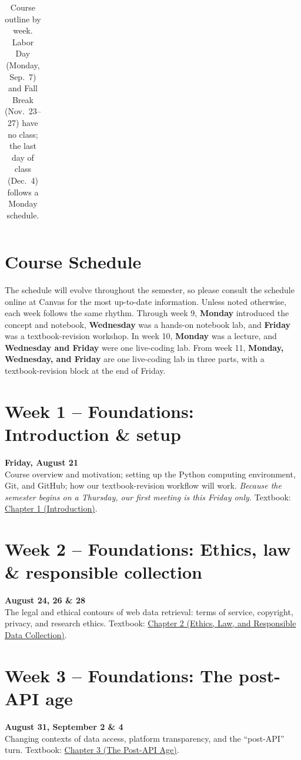 \documentclass[11pt]{memoir}
\def\bookurl{https://cuinfoscience.github.io/Web-Data-Science-Book/}
\newcommand{\bookch}[2]{\href{\bookurl#1.html}{#2}}
\begin{document}
\begin{table}[ht]
\begin{tabular}{cccc}
        \bottomrule[.15em]
    \end{tabular}
    \caption{Course outline by week. Labor Day (Monday, Sep.~7) and Fall Break (Nov.~23--27) have no class; the last day of class (Dec.~4) follows a Monday schedule.}
    \label{tab:course_outline}
\end{table}

\clearpage

\section{\textbf{Course Schedule}}

The schedule will evolve throughout the semester, so please consult the schedule online at Canvas for the most up-to-date information. Unless noted otherwise, each week follows the same rhythm. Through week 9, \textbf{Monday} introduced the concept and notebook, \textbf{Wednesday} was a hands-on notebook lab, and \textbf{Friday} was a textbook-revision workshop. In week 10, \textbf{Monday} was a lecture, and \textbf{Wednesday and Friday} were one live-coding lab. From week 11, \textbf{Monday, Wednesday, and Friday} are one live-coding lab in three parts, with a textbook-revision block at the end of Friday.

\section{Week 1 -- Foundations: Introduction \& setup}
\textcolor{CUGold}{\textbf{Friday, August 21}}\\
Course overview and motivation; setting up the Python computing environment, Git, and GitHub; how our textbook-revision workflow will work. \textit{Because the semester begins on a Thursday, our first meeting is this Friday only.} Textbook: \bookch{ch-01-introduction}{Chapter 1 (Introduction)}.

\section{Week 2 -- Foundations: Ethics, law \& responsible collection}
\textcolor{CUGold}{\textbf{August 24, 26 \& 28}}\\
The legal and ethical contours of web data retrieval: terms of service, copyright, privacy, and research ethics. Textbook: \bookch{ch-02-ethics}{Chapter 2 (Ethics, Law, and Responsible Data Collection)}.

\section{Week 3 -- Foundations: The post-API age}
\textcolor{CUGold}{\textbf{August 31, September 2 \& 4}}\\
Changing contexts of data access, platform transparency, and the ``post-API'' turn. Textbook: \bookch{ch-03-post-api}{Chapter 3 (The Post-API Age)}.
\end{document}
